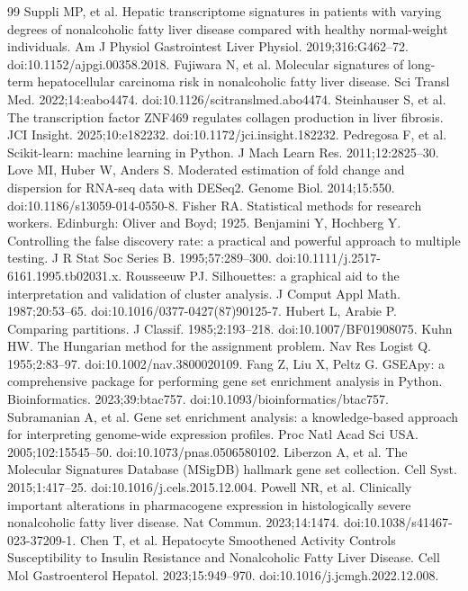 \documentclass[11pt,a4paper]{article}
\begin{document}
{\begin{thebibliography}{99}
 Suppli MP, et al. Hepatic transcriptome signatures in patients with varying degrees of nonalcoholic fatty liver disease compared with healthy normal-weight individuals. Am J Physiol Gastrointest Liver Physiol. 2019;316:G462--72. doi:10.1152/ajpgi.00358.2018.
 Fujiwara N, et al. Molecular signatures of long-term hepatocellular carcinoma risk in nonalcoholic fatty liver disease. Sci Transl Med. 2022;14:eabo4474. doi:10.1126/scitranslmed.abo4474.
 Steinhauser S, et al. The transcription factor ZNF469 regulates collagen production in liver fibrosis. JCI Insight. 2025;10:e182232. doi:10.1172/jci.insight.182232.
 Pedregosa F, et al. Scikit-learn: machine learning in Python. J Mach Learn Res. 2011;12:2825--30.
 Love MI, Huber W, Anders S. Moderated estimation of fold change and dispersion for RNA-seq data with DESeq2. Genome Biol. 2014;15:550. doi:10.1186/s13059-014-0550-8.
 Fisher RA. Statistical methods for research workers. Edinburgh: Oliver and Boyd; 1925.
 Benjamini Y, Hochberg Y. Controlling the false discovery rate: a practical and powerful approach to multiple testing. J R Stat Soc Series B. 1995;57:289--300. doi:10.1111/j.2517-6161.1995.tb02031.x.
 Rousseeuw PJ. Silhouettes: a graphical aid to the interpretation and validation of cluster analysis. J Comput Appl Math. 1987;20:53--65. doi:10.1016/0377-0427(87)90125-7.
 Hubert L, Arabie P. Comparing partitions. J Classif. 1985;2:193--218. doi:10.1007/BF01908075.
 Kuhn HW. The Hungarian method for the assignment problem. Nav Res Logist Q. 1955;2:83--97. doi:10.1002/nav.3800020109.
 Fang Z, Liu X, Peltz G. GSEApy: a comprehensive package for performing gene set enrichment analysis in Python. Bioinformatics. 2023;39:btac757. doi:10.1093/bioinformatics/btac757.
 Subramanian A, et al. Gene set enrichment analysis: a knowledge-based approach for interpreting genome-wide expression profiles. Proc Natl Acad Sci USA. 2005;102:15545--50. doi:10.1073/pnas.0506580102.
 Liberzon A, et al. The Molecular Signatures Database (MSigDB) hallmark gene set collection. Cell Syst. 2015;1:417--25. doi:10.1016/j.cels.2015.12.004.
 Powell NR, et al. Clinically important alterations in pharmacogene expression in histologically severe nonalcoholic fatty liver disease. Nat Commun. 2023;14:1474. doi:10.1038/s41467-023-37209-1.
 Chen T, et al. Hepatocyte Smoothened Activity Controls Susceptibility to Insulin Resistance and Nonalcoholic Fatty Liver Disease. Cell Mol Gastroenterol Hepatol. 2023;15:949--970. doi:10.1016/j.jcmgh.2022.12.008.

\end{thebibliography}}
\end{document}
